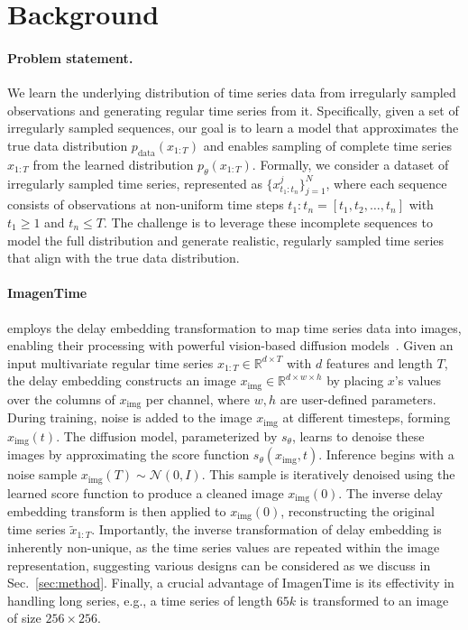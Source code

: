 \documentclass{article}
\theoremstyle{plain}
\theoremstyle{definition}
\theoremstyle{remark}
\begin{document}
\section{Background}
\label{sec:background}
\vspace{-2mm}

\paragraph{Problem statement.} We learn the underlying distribution of time series data from irregularly sampled observations and generating regular time series from it. Specifically, given a set of irregularly sampled sequences, our goal is to learn a model that approximates the true data distribution \( p_{\text{data}}(x_{1:T}) \) and enables sampling of complete time series \( x_{1:T} \) from the learned distribution \( p_\theta(x_{1:T}) \). Formally, we consider a dataset of irregularly sampled time series, represented as \( \{ x_{t_1:t_n}^j \}_{j=1}^N \), where each sequence consists of observations at non-uniform time steps \( t_1:t_n = [t_1, t_2, \dots, t_n] \) with \( t_1 \geq 1 \) and \( t_n \leq T \). The challenge is to leverage these incomplete sequences to model the full distribution and generate realistic, regularly sampled time series that align with the true data distribution.

\vspace{-2mm}
\paragraph{ImagenTime}\hspace{-3mm} employs the delay embedding transformation to map time series data into images, enabling their processing with powerful vision-based diffusion models~\cite{naiman2024utilizing}. Given an input multivariate regular time series $x_{1:T} \in \mathbb{R}^{d \times T}$ with $d$ features and length $T$, the delay embedding constructs an image $x_\text{img} \in \mathbb{R}^{d \times w \times h}$ by placing $x$'s values over the columns of $x_\text{img}$ per channel, where $w, h$ are user-defined parameters. During training, noise is added to the image $x_\text{img}$ at different timesteps, forming $x_\text{img}(t)$. The diffusion model, parameterized by $s_\theta$, learns to denoise these images by approximating the score function $s_\theta(x_\text{img}, t)$. Inference begins with a noise sample $x_\text{img}(T) \sim \mathcal{N}(0, I)$. This sample is iteratively denoised using the learned score function to produce a cleaned image $x_\text{img}(0)$. The inverse delay embedding transform is then applied to $x_\text{img}(0)$, reconstructing the original time series $\tilde{x}_{1:T}$. Importantly, the inverse transformation of delay embedding is inherently non-unique, as the time series values are repeated within the image representation, suggesting various designs can be considered as we discuss in Sec.~\ref{sec:method}. Finally, a crucial advantage of ImagenTime is its effectivity in handling long series, e.g., a time series of length $65k$ is transformed to an image of size $256\times 256$.
\vspace{-2mm}
\end{document}
